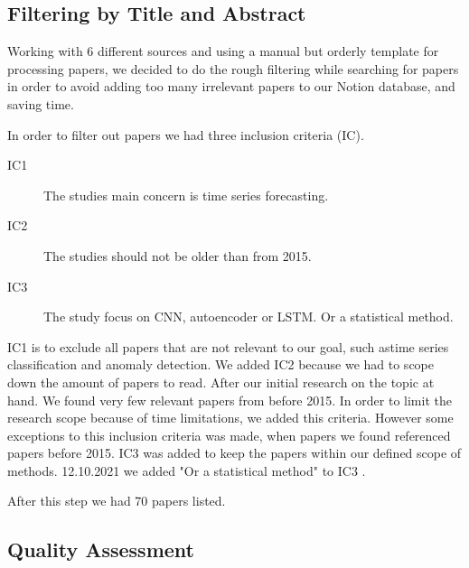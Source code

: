 \subsection{Filtering by Title and Abstract}
Working with 6 different sources and using a manual but orderly template for processing papers,
we decided to do the rough filtering while searching for papers in order to avoid adding too many irrelevant
papers to our Notion database, and saving time.

In order to filter out papers we had three inclusion criteria (IC).
\begin{description}
    \item[IC1] The studies main concern is time series forecasting.
    \item[IC2] The studies should not be older than from 2015.
    \item[IC3] The study focus on CNN, autoencoder or LSTM. Or a statistical method.
\end{description}
IC1 is to exclude all papers that are not relevant to our goal, such astime series classification and anomaly detection.
We added IC2 because we had to scope down the amount of papers to read.
After our initial research on the topic at hand. We found very few relevant papers from before 2015.
In order to limit the research scope because of time limitations, we added this criteria.
However some exceptions to this inclusion criteria was made,
when papers we found referenced papers before 2015.
IC3 was added to keep the papers within our defined scope of methods. 12.10.2021 we added "Or a statistical method"
to IC3 \citep{decisionmatrix}.

After this step we had 70 papers listed.

\subsection{Quality Assessment}

